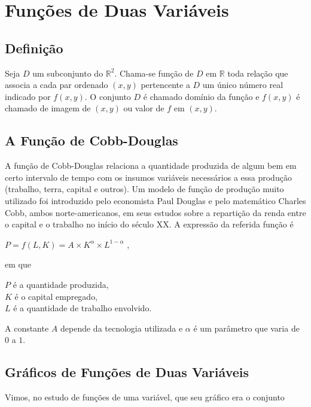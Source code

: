 \section{Funções de Duas Variáveis}

	\subsection{Definição \cite{morettin}}

		Seja $D$ um subconjunto do $\mathbb{R}^{2}$. Chama-se função de $D$ em $\mathbb{R}$ toda relação que associa a cada par ordenado $(x, y)$ pertencente a $D$ um único número real indicado por $f(x, y)$. O conjunto $D$ é chamado domínio da função e $f(x, y)$ é chamado de imagem de $(x, y)$ ou valor de $f$ em $(x, y)$.

	\subsection{A Função de Cobb-Douglas \cite{morettin}}

		A função de Cobb-Douglas relaciona a quantidade produzida de algum bem em certo intervalo de tempo com os insumos variáveis necessários a essa produção (trabalho, terra, capital e outros). Um modelo de função de produção muito utilizado foi introduzido pelo economista Paul Douglas e pelo matemático Charles Cobb, ambos norte-americanos, em seus estudos sobre a repartição da renda entre o capital e o trabalho no início do século XX. A expressão da referida função é

		\bigskip

		{\LARGE $P = f(L, K) = A \times K^{\alpha} \times L^{1 - \alpha}$} ,

		\bigskip

		em que

		\textbf{$P$} é a quantidade produzida, \\
		\textbf{$K$} é o capital empregado, \\
		\textbf{$L$} é a quantidade de trabalho envolvido.

		A constante \textbf{$A$} depende da tecnologia utilizada e \textbf{$\alpha$}  é um parâmetro que varia de $0$ a $1$.

	\subsection{Gráficos de Funções de Duas Variáveis \cite{morettin}}

		Vimos, no estudo de funções de uma variável, que seu gráfico era o conjunto


